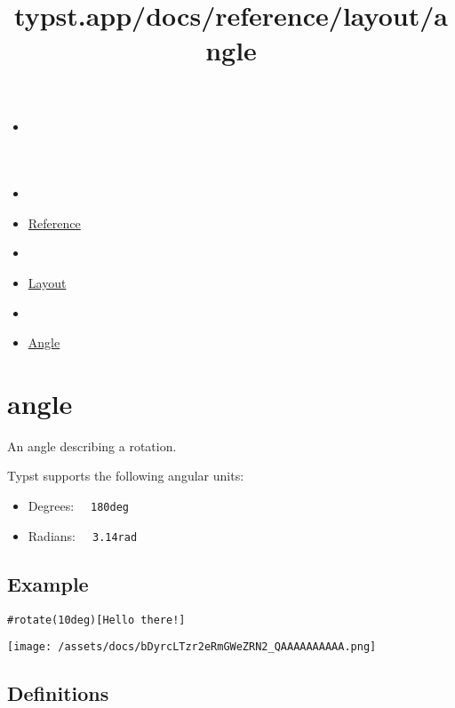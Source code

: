 \title{typst.app/docs/reference/layout/angle}

\begin{itemize}
\tightlist
\item
  \href{/docs}{}
\item
  
\item
  \href{/docs/reference/}{Reference}
\item
  
\item
  \href{/docs/reference/layout/}{Layout}
\item
  
\item
  \href{/docs/reference/layout/angle/}{Angle}
\end{itemize}

\section{\texorpdfstring{{ angle }}{ angle }}\label{summary}

An angle describing a rotation.

Typst supports the following angular units:

\begin{itemize}
\tightlist
\item
  Degrees: \texttt{\ }{\texttt{\ 180deg\ }}\texttt{\ }
\item
  Radians: \texttt{\ }{\texttt{\ 3.14rad\ }}\texttt{\ }
\end{itemize}

\subsection{Example}\label{example}

\begin{verbatim}
#rotate(10deg)[Hello there!]
\end{verbatim}

\texttt{[image: /assets/docs/bDyrcLTzr2eRmGWeZRN2\_QAAAAAAAAAA.png]}

\subsection{\texorpdfstring{{ Definitions
}}{ Definitions }}\label{definitions}

